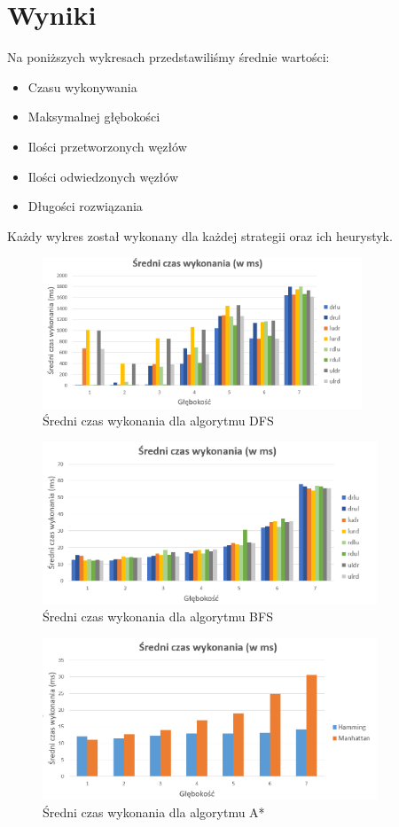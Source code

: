 \documentclass{classrep}
\begin{document}
\section{Wyniki}
Na poniższych wykresach przedstawiliśmy średnie wartości:
\begin{itemize}
\item Czasu wykonywania
\item Maksymalnej głębokości
\item Ilości przetworzonych węzłów
\item Ilości odwiedzonych węzłów
\item Długości rozwiązania
\end{itemize}
Każdy wykres został wykonany dla każdej strategii oraz ich heurystyk.
\begin{figure}[h!]
    \centering
    \includegraphics[width=0.85\textwidth]{czasdfs.png}
    \caption{Średni czas wykonania dla algorytmu DFS}
	\label{czasdfs}
\end{figure}
\begin{figure}[h!]
    \centering
    \includegraphics[width=0.89\textwidth]{czasbfs.png}
    \caption{Średni czas wykonania dla algorytmu BFS}
	\label{czasbfs}
\end{figure}
\begin{figure}[h!]
    \centering
    \includegraphics[width=0.89\textwidth]{czasastr.png}
    \caption{Średni czas wykonania dla algorytmu A*}
	\label{czasastr}
\end{figure}
\end{document}
